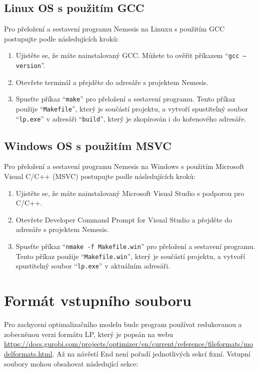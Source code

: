 \documentclass[czech, sem, kiv, he, pdf, viewonly]{fasthesis}
\begin{document}
\subsection{Linux OS s použitím GCC}
Pro přeložení a sestavení programu Nemesis na Linuxu s použitím GCC postupujte podle následujících kroků:
\begin{enumerate}
    \item Ujistěte se, že máte nainstalovaný GCC. Můžete to ověřit příkazem ``\texttt{gcc --version}''.
    \item Otevřete terminál a přejděte do adresáře s projektem Nemesis.
    \item Spusťte příkaz ``\texttt{make}'' pro přeložení a sestavení programu. Tento příkaz použije ``\texttt{Makefile}'', který je součástí projektu, a vytvoří spustitelný soubor ``\texttt{lp.exe}'' v adresáři ``\texttt{build}'', který je zkopírován i do kořenového adresáře.
\end{enumerate}

\subsection{Windows OS s použitím MSVC}
Pro přeložení a sestavení programu Nemesis na Windows s použitím Microsoft Visual C/C++ (MSVC) postupujte podle následujících kroků:
\begin{enumerate}
    \item Ujistěte se, že máte nainstalovaný Microsoft Visual Studio s podporou pro C/C++.
    \item Otevřete Developer Command Prompt for Visual Studio a přejděte do adresáře s projektem Nemesis.
    \item Spusťte příkaz ``\texttt{nmake -f Makefile.win}'' pro přeložení a sestavení programu. Tento příkaz použije ``\texttt{Makefile.win}'', který je součástí projektu, a vytvoří spustitelný soubor ``\texttt{lp.exe}'' v aktuálním adresáři.
\end{enumerate}

\section{Formát vstupního souboru}
Pro zachycení optimalizačního modelu bude program používat redukovanou a zobecněnou verzi formátu LP, který je popsán na webu \url{https://docs.gurobi.com/projects/optimizer/en/current/reference/fileformats/modelformats.html}. Až na návěstí End není pořadí jednotlivých sekcí fixní. Vstupní soubory mohou obsahovat následující sekce:
\end{document}
